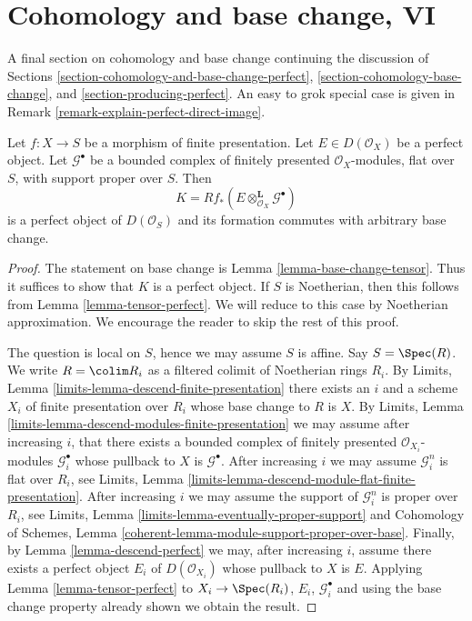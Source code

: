 \section{Cohomology and base change, VI}
\label{section-cohomology-and-base-change-final}

\noindent
A final section on cohomology and base change continuing
the discussion of Sections
\ref{section-cohomology-and-base-change-perfect},
\ref{section-cohomology-base-change}, and
\ref{section-producing-perfect}.
An easy to grok special case is given in
Remark \ref{remark-explain-perfect-direct-image}.

\begin{lemma}
\label{lemma-base-change-tensor-perfect}
Let $f : X \to S$ be a morphism of finite presentation.
Let $E \in D(\mathcal{O}_X)$ be a perfect object. Let $\mathcal{G}^\bullet$
be a bounded complex of finitely presented $\mathcal{O}_X$-modules,
flat over $S$, with support proper over $S$. Then
$$
K = Rf_*(E \otimes_{\mathcal{O}_X}^\mathbf{L} \mathcal{G}^\bullet)
$$
is a perfect object of $D(\mathcal{O}_S)$ and its formation
commutes with arbitrary base change.
\end{lemma}

\begin{proof}
The statement on base change is Lemma \ref{lemma-base-change-tensor}.
Thus it suffices to show that $K$ is a perfect object. If $S$ is
Noetherian, then this follows from
Lemma \ref{lemma-tensor-perfect}.
We will reduce to this case by Noetherian approximation.
We encourage the reader to skip the rest of this proof.

\medskip\noindent
The question is local on $S$, hence we may assume $S$ is affine.
Say $S = \Spec(R)$. We write $R = \colim R_i$ as a filtered colimit
of Noetherian rings $R_i$. By Limits, Lemma
\ref{limits-lemma-descend-finite-presentation}
there exists an $i$ and a scheme $X_i$ of finite presentation over $R_i$
whose base change to $R$ is $X$. By
Limits, Lemma \ref{limits-lemma-descend-modules-finite-presentation}
we may assume after increasing $i$, that there exists a bounded
complex of finitely presented $\mathcal{O}_{X_i}$-modules
$\mathcal{G}_i^\bullet$ whose pullback to $X$ is $\mathcal{G}^\bullet$.
After increasing $i$ we may assume $\mathcal{G}_i^n$ is flat over $R_i$, see
Limits, Lemma \ref{limits-lemma-descend-module-flat-finite-presentation}.
After increasing $i$ we may assume the support of $\mathcal{G}_i^n$
is proper over $R_i$, see
Limits, Lemma \ref{limits-lemma-eventually-proper-support}
and Cohomology of Schemes, Lemma
\ref{coherent-lemma-module-support-proper-over-base}.
Finally, by Lemma \ref{lemma-descend-perfect}
we may, after increasing $i$, assume there exists a perfect
object $E_i$ of $D(\mathcal{O}_{X_i})$ whose pullback to
$X$ is $E$. Applying Lemma \ref{lemma-tensor-perfect}
to $X_i \to \Spec(R_i)$, $E_i$, $\mathcal{G}_i^\bullet$ and using the
base change property already shown we obtain the result.
\end{proof}

